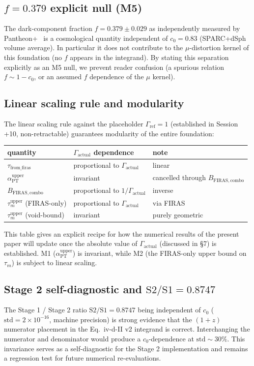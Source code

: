 \documentclass[11pt,a4paper]{article}
\newcommand{\aPT}{\alpha_{\mathrm{PT}}}
\newcommand{\taum}{\tau_{m}}
\newcommand{\BFIRAS}{B_{\mathrm{FIRAS,combo}}}
\newcommand{\Gammaref}{\Gamma_{\mathrm{ref}}}
\newcommand{\Gammaact}{\Gamma_{\mathrm{actual}}}
\begin{document}
\subsection{$f = 0.379$ explicit null (M5)}
The dark-component fraction $f = 0.379 \pm 0.029$ as independently measured by
Pantheon+~\citep{Scolnic2022} is a cosmological quantity independent of $c_0 = 0.83$
(SPARC+dSph volume average). In particular it does not contribute to the $\mu$-distortion kernel of
this foundation (no $f$ appears in the integrand). By stating this separation explicitly as an M5
null, we prevent reader confusion (a spurious relation $f \sim 1 - c_0$, or an assumed $f$
dependence of the $\mu$ kernel).

\subsection{Linear scaling rule and modularity}
The linear scaling rule against the placeholder $\Gammaref = 1$ (established in Session +10,
non-retractable) guarantees modularity of the entire foundation:

\begin{center}\small
\begin{tabular}{@{}lll@{}}
\toprule
quantity & $\Gammaact$ dependence & note \\
\midrule
$\tau_{\mathrm{from\_firas}}$ & proportional to $\Gammaact$ & linear \\
$\aPT^{\mathrm{upper}}$ & invariant & cancelled through $\BFIRAS$ \\
$\BFIRAS$ & proportional to $1/\Gammaact$ & inverse \\
$\taum^{\mathrm{upper}}$ (FIRAS-only) & proportional to $\Gammaact$ & via FIRAS \\
$\taum^{\mathrm{upper}}$ (void-bound) & invariant & purely geometric \\
\bottomrule
\end{tabular}
\end{center}

This table gives an explicit recipe for how the numerical results of the present paper will update
once the absolute value of $\Gammaact$ (discussed in \S 7) is established. M1 ($\aPT^{\mathrm{upper}}$)
is invariant, while M2 (the FIRAS-only upper bound on $\taum$) is subject to linear scaling.

\subsection{Stage 2 self-diagnostic and $\mathrm{S2/S1} = 0.8747$}
The Stage 1 / Stage 2 ratio $\mathrm{S2/S1} = 0.8747$ being independent of $c_0$
($\mathrm{std} = 2 \times 10^{-16}$, machine precision) is strong evidence that the $(1+z)$
numerator placement in the Eq.~iv-d-II v2 integrand is correct. Interchanging the numerator and
denominator would produce a $c_0$-dependence at $\mathrm{std} \sim 30\%$. This invariance serves as
a self-diagnostic for the Stage 2 implementation and remains a regression test for future numerical
re-evaluations.
\end{document}
